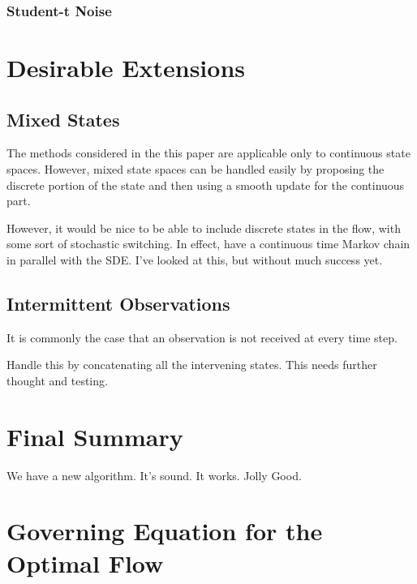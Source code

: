 \documentclass[a4paper,10pt]{article}
\begin{document}
\subsubsection{Student-t Noise}






\section{Desirable Extensions}

\subsection{Mixed States}

The methods considered in the this paper are applicable only to continuous state spaces. However, mixed state spaces can be handled easily by proposing the discrete portion of the state and then using a smooth update for the continuous part.

{\meta However, it would be nice to be able to include discrete states in the flow, with some sort of stochastic switching. In effect, have a continuous time Markov chain in parallel with the SDE. I've looked at this, but without much success yet.}

\subsection{Intermittent Observations}

It is commonly the case that an observation is not received at every time step.

{\meta Handle this by concatenating all the intervening states. This needs further thought and testing.}



\section{Final Summary}

{\meta We have a new algorithm. It's sound. It works. Jolly Good.}





\appendix

\section{Governing Equation for the Optimal Flow} \label{app:optimal_flow_governing_eq}
\end{document}
